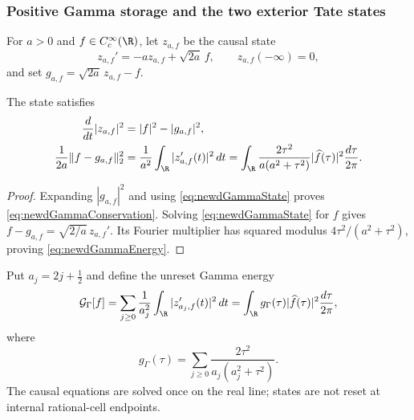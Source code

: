 \subsubsection{Positive Gamma storage and the two exterior Tate states}

For $a>0$ and $f\in C_c^\infty(\R)$, let $z_{a,f}$ be the causal state
\begin{equation}\label{eq:newdGammaState}
 z_{a,f}'=-az_{a,f}+\sqrt{2a}\,f,
 \qquad z_{a,f}(-\infty)=0,
\end{equation}
and set $g_{a,f}=\sqrt{2a}\,z_{a,f}-f$.

\begin{lemma}
\label{lem:newdGammaState}
The state satisfies
\begin{align}
 \frac d{dt}|z_{a,f}|^2&=|f|^2-|g_{a,f}|^2,
 \label{eq:newdGammaConservation}\\
 \frac1{2a}\|f-g_{a,f}\|_2^2
 &=\frac1{a^2}\int_\R|z_{a,f}'(t)|^2\,dt
 =\int_\R\frac{2\tau^2}{a(a^2+\tau^2)}
       |\widehat f(\tau)|^2\frac{d\tau}{2\pi}.
 \label{eq:newdGammaEnergy}
\end{align}
\end{lemma}

\begin{proof}
Expanding $|g_{a,f}|^2$ and using
\eqref{eq:newdGammaState} proves
\eqref{eq:newdGammaConservation}.  Solving
\eqref{eq:newdGammaState} for $f$ gives
$f-g_{a,f}=\sqrt{2/a}\,z_{a,f}'$.  Its Fourier multiplier has squared
modulus $4\tau^2/(a^2+\tau^2)$, proving
\eqref{eq:newdGammaEnergy}.
\end{proof}

Put $a_j=2j+\tfrac12$ and define the unreset Gamma energy
\begin{equation}\label{eq:newdFullGammaEnergy}
 \mathcal G_\Gamma[f]
 =\sum_{j\geq0}\frac1{a_j^2}\int_\R|z_{a_j,f}'(t)|^2\,dt
 =\int_\R g_\Gamma(\tau)|\widehat f(\tau)|^2
      \frac{d\tau}{2\pi},
\end{equation}
where
\begin{equation}\label{eq:newdGammaMultiplier}
 g_\Gamma(\tau)=
 \sum_{j\geq0}\frac{2\tau^2}{a_j(a_j^2+\tau^2)}.
\end{equation}
The causal equations are solved once on the real line; states are not reset
at internal rational-cell endpoints.

